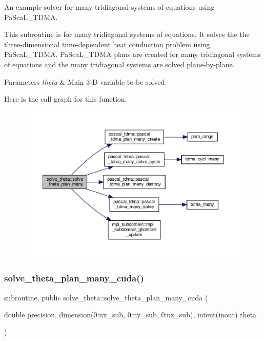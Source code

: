 An example solver for many tridiagonal systems of equations using Pa\+Sca\+L\+\_\+\+T\+D\+MA. 

This subroutine is for many tridiagonal systems of equations. It solves the the three-\/dimensional time-\/dependent heat conduction problem using Pa\+Sca\+L\+\_\+\+T\+D\+MA. Pa\+Sca\+L\+\_\+\+T\+D\+MA plans are created for many tridiagonal systems of equations and the many tridiagonal systems are solved plane-\/by-\/plane. 
\begin{DoxyParams}{Parameters}
{\em theta} & Main 3-\/D variable to be solved \\
\hline
\end{DoxyParams}
Here is the call graph for this function\+:
\nopagebreak
\begin{figure}[H]
\begin{center}
\leavevmode
\includegraphics[width=350pt]{namespacesolve__theta_a0b7fdb576c007dc344092bf40efb0f4b_cgraph}
\end{center}
\end{figure}
\mbox{\label{namespacesolve__theta_a84c4bdc671112259790470f6ad4c7e4c}} 
\subsubsection{\texorpdfstring{solve\+\_\+theta\+\_\+plan\+\_\+many\+\_\+cuda()}{solve\_theta\_plan\_many\_cuda()}}
{\footnotesize\ttfamily subroutine, public solve\+\_\+theta\+::solve\+\_\+theta\+\_\+plan\+\_\+many\+\_\+cuda (\begin{DoxyParamCaption}\item[{double precision, dimension(0\+:nx\+\_\+sub, 0\+:ny\+\_\+sub, 0\+:nz\+\_\+sub), intent(inout)}]{theta }\end{DoxyParamCaption})}



